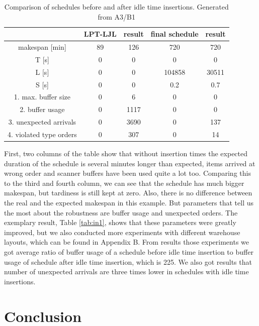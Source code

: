 \documentclass{ctuthesis}
\begin{document}
\begin{table}[H]
\begin{tabular}{ |c|| c | c | c | c |} 
\hline
 & LPT-LJL & result & final schedule & result \\ 
\hline
makespan [min] & 89 & 126 & 720 & 720 \\
\hline
T [s]& 0 & 0 & 0 & 0 \\
\hline
L [s]& 0 & 0 & 104858 & 30511 \\
\hline
S [s]& 0 & 0 & 0.2 & 0.7 \\
\hline
1. max. buffer size & 0 & 6 & 0 & 0\\ 
\hline
2. buffer usage  & 0 & 1117 & 0 & 0\\ 
\hline
3. unexpected arrivals & 0 & 3690 & 0 & 137\\ 
\hline
4. violated type orders & 0 & 307 & 0 & 14\\ 
\hline
\end{tabular}
\caption{Comparison of schedules before and after idle time insertions. Generated from A3/B1} \label{tab:idle1}
\end{table}

First, two columns of the table show that without insertion times the expected duration of the schedule is several minutes longer than expected, items arrived at wrong order and scanner buffers have been used quite a lot too. Comparing this to the third and fourth column, we can see that the schedule has much bigger makespan, but tardiness is still kept at zero. Also, there is no difference between the real and the expected makespan in this example. But parameters that tell us the most about the robustness are buffer usage and unexpected orders. The exemplary result, Table \ref{tab:in1}, shows that these parameters were greatly improved, but we also conducted more experiments with different warehouse layouts, which can be found in Appendix B. From results those experiments we got average ratio of buffer usage of a schedule before idle time insertion to buffer usage of schedule after idle time insertion, which is 225. We also got results that number of unexpected arrivals are three times lower in schedules with idle time insertions. 

\chapter{Conclusion}
\end{document}
